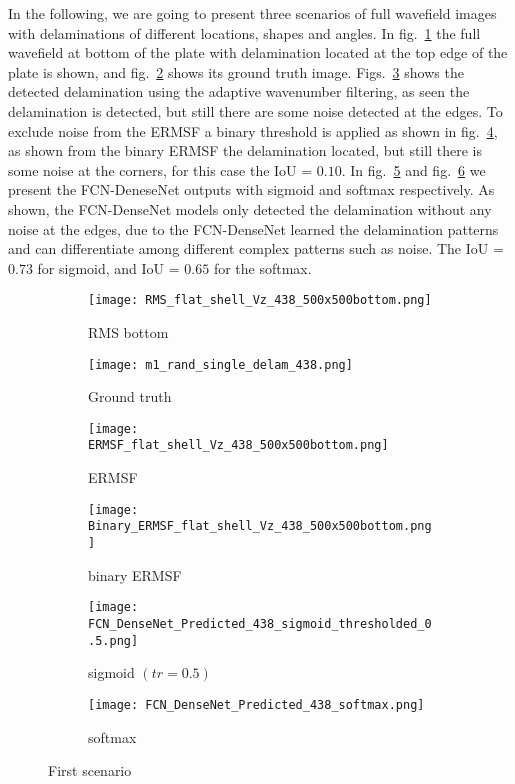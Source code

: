 	In the following, we are going to present three scenarios of full wavefield images with delaminations of different locations, shapes and angles.
	In fig.~\ref{fig:RMS_flat_shell_Vz_438} the full wavefield at bottom of the plate with delamination located at the top edge of the plate is shown, and fig.~\ref{fig:m1_rand_single_delam_438} shows its ground truth image. 
	Figs.~\ref{fig:ERMSF_flat_shell_Vz_438} shows the detected delamination using the adaptive wavenumber filtering, as seen the delamination is detected, but still there are some noise detected at the edges. 
	To exclude noise from the ERMSF a binary threshold is applied as shown in fig.~\ref{fig:Binary_ERMSF_flat_shell_Vz_438}, as shown from the binary ERMSF the delamination located, but still there is some noise at the corners, for this case the IoU = \(0.10\).
	In fig.~\ref{fig:predict_438_sigmoid_tr_0.5} and fig.~\ref{fig:predict_438_softmax} we present the FCN-DeneseNet outputs with sigmoid and softmax respectively.
	As shown, the FCN-DenseNet models only detected the delamination without any noise at the edges, due to the FCN-DenseNet learned the delamination patterns and can differentiate among different complex patterns such as noise.   
	The IoU = \(0.73\) for sigmoid, and IoU = \(0.65\) for the softmax.
	\begin{figure} [H]
		\centering
		\begin{subfigure}[b]{0.47\textwidth}
			\centering
			\texttt{[image: RMS\_flat\_shell\_Vz\_438\_500x500bottom.png]}
			\caption{RMS bottom}
			\label{fig:RMS_flat_shell_Vz_438}
		\end{subfigure}
		\hfill
			\begin{subfigure}[b]{0.47\textwidth}
			\centering
			\texttt{[image: m1\_rand\_single\_delam\_438.png]}
			\caption{Ground truth}
			\label{fig:m1_rand_single_delam_438}
		\end{subfigure}
		\hfill
		\begin{subfigure}[b]{0.47\textwidth}
			\centering
			\texttt{[image: ERMSF\_flat\_shell\_Vz\_438\_500x500bottom.png]}
			\caption{ERMSF}
			\label{fig:ERMSF_flat_shell_Vz_438}
		\end{subfigure}
		\hfill
		\begin{subfigure}[b]{0.47\textwidth}
			\centering
			\texttt{[image: Binary\_ERMSF\_flat\_shell\_Vz\_438\_500x500bottom.png]}
			\caption{binary ERMSF}
			\label{fig:Binary_ERMSF_flat_shell_Vz_438}
		\end{subfigure}
		\hfill
		\begin{subfigure}[b]{0.47\textwidth}
			\centering
		\texttt{[image: FCN\_DenseNet\_Predicted\_438\_sigmoid\_thresholded\_0.5.png]}
		\caption{sigmoid \((tr = 0.5)\)}
		\label{fig:predict_438_sigmoid_tr_0.5}
		\end{subfigure}
		\hfill
		\begin{subfigure}[b]{0.47\textwidth}
			\centering
			\texttt{[image: FCN\_DenseNet\_Predicted\_438\_softmax.png]}
			\caption{softmax}
			\label{fig:predict_438_softmax}
		\end{subfigure}
		\caption{First scenario}
		\label{fig:RMS438}
	\end{figure} 
